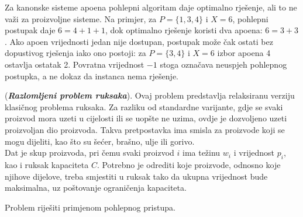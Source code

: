 Za kanonske sisteme apoena pohlepni algoritam daje optimalno rješenje, ali to ne važi za proizvoljne sisteme. Na primjer, za $P=\{1,3,4\}$ i $X=6$, pohlepni postupak daje $6=4+1+1$, dok optimalno rješenje koristi dva apoena: $6=3+3$. Ako apoen vrijednosti jedan nije dostupan, postupak može čak ostati bez dopustivog rješenja iako ono postoji: za $P=\{3,4\}$ i $X=6$ izbor apoena 4 ostavlja ostatak 2. Povratna vrijednost $-1$ stoga označava neuspjeh pohlepnog postupka, a ne dokaz da instanca nema rješenje.

\begin{example}
	(\textbf{\emph{Razlomljeni problem ruksaka}}). Ovaj problem predstavlja relaksiranu verziju klasičnog problema ruksaka. Za razliku od standardne varijante, gdje se svaki proizvod mora uzeti u cijelosti ili se uopšte ne uzima, ovdje je dozvoljeno uzeti proizvoljan dio proizvoda. Takva pretpostavka ima smisla za proizvode koji se mogu dijeliti, kao što su šećer, brašno, ulje ili gorivo. \\
	
	Dat je skup proizvoda, pri čemu svaki proizvod $i$ ima težinu $w_i$ i vrijednost $p_i$, kao i ruksak kapaciteta $C$. Potrebno je odrediti koje proizvode, odnosno koje njihove dijelove, treba smjestiti u ruksak tako da ukupna vrijednost bude maksimalna, uz poštovanje ograničenja kapaciteta.
	
	Problem riješiti primjenom pohlepnog pristupa.
\end{example}

